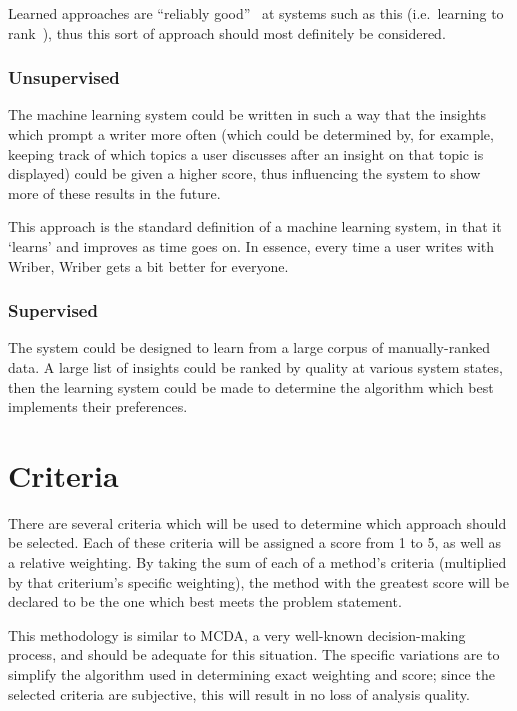 \documentclass[12pt]{article}
\begin{document}
Learned approaches are ``reliably good''~\cite{bi} at systems such as this (i.e.\ learning to rank~\cite{ltr}), thus this sort of approach should most definitely be considered.

\subsubsection{Unsupervised}
The machine learning system could be written in such a way that the insights which prompt a writer more often (which could be determined by, for example, keeping track of which topics a user discusses after an insight on that topic is displayed) could be given a higher score, thus influencing the system to show more of these results in the future.

This approach is the standard definition of a machine learning system, in that it `learns' and improves as time goes on. In essence, every time a user writes with Wriber, Wriber gets a bit better for everyone.

\subsubsection{Supervised}
The system could be designed to learn from a large corpus of manually-ranked data. A large list of insights could be ranked by quality at various system states, then the learning system could be made to determine the algorithm which best implements their preferences.
\newpage


\section{Criteria}
There are several criteria which will be used to determine which approach should be selected. Each of these criteria will be assigned a score from 1 to 5, as well as a relative weighting. By taking the sum of each of a method's criteria (multiplied by that criterium's specific weighting), the method with the greatest score will be declared to be the one which best meets the problem statement.

This methodology is similar to MCDA, a very well-known decision-making process, and should be adequate for this situation. The specific variations are to simplify the algorithm used in determining exact weighting and score; since the selected criteria are subjective, this will result in no loss of analysis quality.
\end{document}
